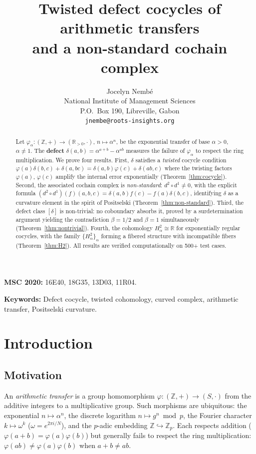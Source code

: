 \documentclass[11pt,a4paper]{article}
\title{Twisted defect cocycles of arithmetic transfers \\
and a non-standard cochain complex}
\author{Jocelyn Nemb\'e \\
\small National Institute of Management Sciences \\
\small P.O.\ Box 190, Libreville, Gabon \\
\small\texttt{jnembe@roots-insights.org}}
\date{}
\theoremstyle{plain}
\theoremstyle{definition}
\theoremstyle{remark}
\newcommand{\ZZ}{\mathbb{Z}}
\newcommand{\RR}{\mathbb{R}}
\begin{document}
\maketitle

\begin{abstract}
Let $\varphi_\alpha : (\ZZ, +) \to (\RR_{>0}, \cdot)$, $n \mapsto 
\alpha^n$, be the exponential transfer of base $\alpha > 0$, $\alpha 
\neq 1$. The \textbf{defect} $\delta(a,b) = \alpha^{a+b} - \alpha^{ab}$ 
measures the failure of $\varphi_\alpha$ to respect the ring 
multiplication. We prove four results. First, $\delta$ satisfies a 
\textit{twisted} cocycle condition 
$\varphi(a)\delta(b,c) + \delta(a,bc) = \delta(a,b)\varphi(c) + 
\delta(ab,c)$ where the twisting factors $\varphi(a)$, $\varphi(c)$ 
amplify the internal error exponentially (Theorem~\ref{thm:cocycle}). 
Second, the associated cochain complex is \textit{non-standard}: 
$d^2 \circ d^1 \neq 0$, with the explicit formula 
$(d^2 \circ d^1)(f)(a,b,c) = \delta(a,b)f(c) - f(a)\delta(b,c)$, 
identifying $\delta$ as a curvature element in the spirit 
of Positselski (Theorem~\ref{thm:non-standard}). Third, the defect 
class $[\delta]$ is non-trivial: no coboundary absorbs it, proved by 
a surdetermination argument yielding the contradiction $\beta = 1/2$ 
and $\beta = 1$ simultaneously (Theorem~\ref{thm:nontrivial}). Fourth, 
the cohomology $H^2_\alpha \cong \RR$ for exponentially regular 
cocycles, with the family $\{H^2_\alpha\}_\alpha$ forming a fibered 
structure with incompatible fibers (Theorem~\ref{thm:H2}). All results 
are verified computationally on 500+ test cases.
\end{abstract}

\noindent\textbf{MSC 2020:} 16E40, 18G35, 13D03, 11R04.

\noindent\textbf{Keywords:} Defect cocycle, twisted cohomology, curved 
complex, arithmetic transfer, Positselski curvature.

\section{Introduction}
\label{sec:intro}

\subsection{Motivation}

An \textit{arithmetic transfer} is a group homomorphism 
$\varphi : (\ZZ, +) \to (S, \cdot)$ from the additive integers to a 
multiplicative group. Such morphisms are ubiquitous: the exponential 
$n \mapsto \alpha^n$, the discrete logarithm $n \mapsto g^n \bmod p$, 
the Fourier character $k \mapsto \omega^k$ ($\omega = e^{2\pi i/N}$), 
and the $p$-adic embedding $\ZZ \hookrightarrow \ZZ_p$. Each 
respects addition ($\varphi(a+b) = \varphi(a)\varphi(b)$) but 
generally fails to respect the ring multiplication: 
$\varphi(ab) \neq \varphi(a)\varphi(b)$ when $a + b \neq ab$.
\end{document}
